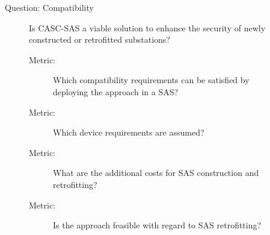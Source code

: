 \begin{description}
\begin{description}
\begin{description}
        \end{description}
        \item[Question: Compatibility] Is CASC-SAS a viable solution to enhance the security of newly constructed or retrofitted substations?
        \begin{description}
            \item[Metric:] Which compatibility requirements can be satisfied by deploying the approach in a SAS?
            \item[Metric:] Which device requirements are assumed?
            \item[Metric:] What are the additional costs for SAS construction and retrofitting?
            \item[Metric:] Is the approach feasible with regard to SAS retrofitting?
        \end{description}
    \end{description}
\end{description}

